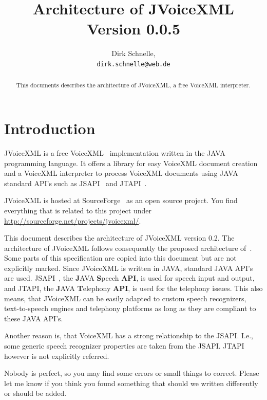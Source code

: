\documentclass[11pt,a4paper]{article}
\title{Architecture of JVoiceXML \\
Version 0.0.5}
\author{Dirk Schnelle,  \\
  \texttt{dirk.schnelle@web.de} }
\date{}
\begin{document}
\pagestyle{headings}

\maketitle

\begin{abstract}
This documents describes the architecture of JVoiceXML, a free
VoiceXML interpreter.
\end{abstract}

\tableofcontents

\section{Introduction}
\label{sec:introduction}

JVoiceXML is a free VoiceXML~\cite{w3.org:voicexml} implementation written in 
the JAVA programming language. It offers a library for easy VoiceXML
document creation and a VoiceXML interpreter to process 
VoiceXML documents using JAVA standard API's such as JSAPI~\cite{sun:jsapi} and
JTAPI~\cite{sun:jsapi}.

JVoiceXML is hosted at SourceForge~\cite{sourceforge} as an open source 
project.
You find everything that is related to this project under
\url{http://sourceforge.net/projects/jvoicexml/}.

This document describes the architecture of JVoiceXML version 0.2. The
architecture of JVoiceXML follows
consequently the proposed architecture of~\cite{w3.org:voicexml}.
Some parts of this specification are copied into this document
but are not explicitly marked.
Since JVoiceXML is written in JAVA, standard JAVA API's are used.
JSAPI~\cite{sun:jsapi}, the \textbf{J}AVA \textbf{S}peech \textbf{API},
is used for speech input and output,
and JTAPI, the \textbf{J}AVA \textbf{T}elephony \textbf{API}, is used for the 
telephony issues. This also means, that
JVoiceXML can be easily adapted to custom speech recognizers,
text-to-speech engines and telephony platforms as long as they
are compliant to these JAVA API's.

Another reason is, that VoiceXML has a strong relationship to the JSAPI.
I.e., some generic speech recognizer properties are taken
from the JSAPI. JTAPI however is not explicitly referred.

Nobody is perfect, so you may find some errors or small things to correct.
Please let me know if you think you found something that should we written
differently or should be added.
\end{document}
